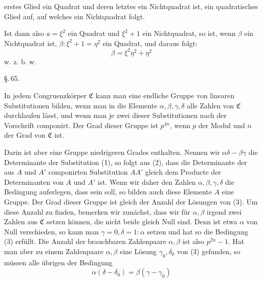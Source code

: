 erstes Glied ein Quadrat und deren letztes ein Nichtquadrat ist, ein quadratisches Glied auf, auf welches ein Nichtquadrat folgt.

Ist dann also $a = \xi^2$ ein Quadrat und $\xi^2 + 1$ ein Nichtquadrat, so ist, wenn $\beta$ ein Nichtquadrat ist, $\beta : \xi^2 + 1 = \eta^2$ ein Quadrat, und daraus folgt:
\[ \beta = \xi^2 \eta^2 + \eta^2 \]
w. z. b. w.

\begin{center}
\S.\,65.

\end{center}

In jedem Congruenzk\"orper $\mathfrak{C}$ kann man eine endliche Gruppe von linearen Substitutionen bilden, wenn man in
die Elemente $\alpha, \beta, \gamma, \delta$ alle Zahlen von $\mathfrak{C}$ durchlaufen l\"asst, und wenn man je zwei dieser Substitutionen nach der Vorschrift
componirt. Der Grad dieser Gruppe ist $p^{4n}$, wenn $p$ der Modul und $n$ der Grad von $\mathfrak{C}$ ist.

Darin ist aber eine Gruppe niedrigeren Grades enthalten. Nennen wir $\alpha\delta - \beta\gamma$ die Determinante der Substitution (1), so folgt aus (2), dass die Determinante der aus $A$ und $A'$ componirten Substitution $AA'$ gleich dem Producte der Determinanten von $A$ und $A'$ ist. Wenn wir daher den Zahlen $\alpha, \beta, \gamma, \delta$ die Bedingung auferlegen, dass
sein soll, so bilden auch diese Elemente $A$ eine Gruppe. Der Grad dieser Gruppe ist gleich der Anzahl der L\"osungen von (3). Um diese Anzahl zu finden, bemerken wir zun\"achst, dass wir f\"ur $\alpha, \beta$ irgend zwei Zahlen aus $\mathfrak{C}$ setzen k\"onnen, die nicht beide gleich Null sind. Denn ist etwa $\alpha$ von Null verschieden, so kann man $\gamma = 0, \delta = 1 : \alpha$ setzen und hat so die Bedingung (3) erf\"ullt. Die Anzahl der brauchbaren Zahlenpaare $\alpha, \beta$ ist also $p^{2n} - 1$. Hat man aber zu einem Zahlenpaare $\alpha, \beta$ eine L\"osung $\gamma_0, \delta_0$ von (3) gefunden, so m\"ussen alle \"ubrigen der Bedingung
\[ \alpha (\delta - \delta_0) = \beta (\gamma - \gamma_0) \]
